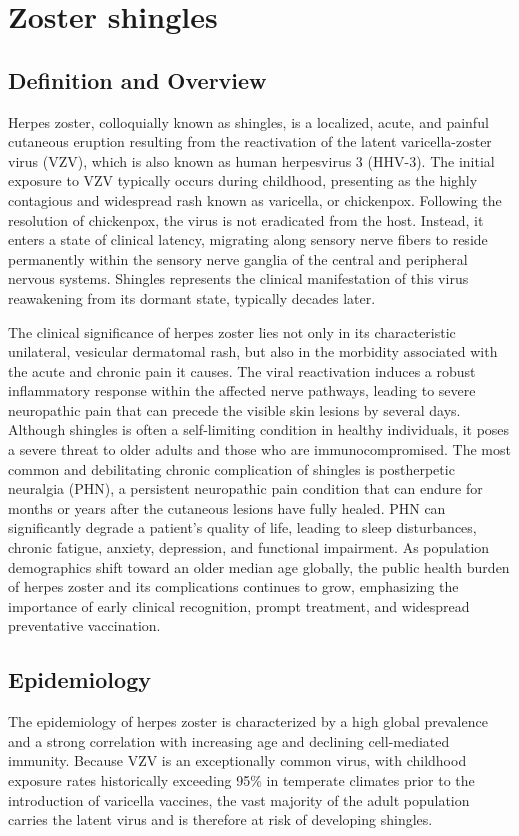 \chapter{Zoster shingles}

\section*{Definition and Overview}
Herpes zoster, colloquially known as shingles, is a localized, acute, and painful cutaneous eruption resulting from the reactivation of the latent varicella-zoster virus (VZV), which is also known as human herpesvirus 3 (HHV-3). The initial exposure to VZV typically occurs during childhood, presenting as the highly contagious and widespread rash known as varicella, or chickenpox. Following the resolution of chickenpox, the virus is not eradicated from the host. Instead, it enters a state of clinical latency, migrating along sensory nerve fibers to reside permanently within the sensory nerve ganglia of the central and peripheral nervous systems. Shingles represents the clinical manifestation of this virus reawakening from its dormant state, typically decades later.

The clinical significance of herpes zoster lies not only in its characteristic unilateral, vesicular dermatomal rash, but also in the morbidity associated with the acute and chronic pain it causes. The viral reactivation induces a robust inflammatory response within the affected nerve pathways, leading to severe neuropathic pain that can precede the visible skin lesions by several days. Although shingles is often a self-limiting condition in healthy individuals, it poses a severe threat to older adults and those who are immunocompromised. The most common and debilitating chronic complication of shingles is postherpetic neuralgia (PHN), a persistent neuropathic pain condition that can endure for months or years after the cutaneous lesions have fully healed. PHN can significantly degrade a patient's quality of life, leading to sleep disturbances, chronic fatigue, anxiety, depression, and functional impairment. As population demographics shift toward an older median age globally, the public health burden of herpes zoster and its complications continues to grow, emphasizing the importance of early clinical recognition, prompt treatment, and widespread preventative vaccination.

\section*{Epidemiology}
The epidemiology of herpes zoster is characterized by a high global prevalence and a strong correlation with increasing age and declining cell-mediated immunity. Because VZV is an exceptionally common virus, with childhood exposure rates historically exceeding 95\% in temperate climates prior to the introduction of varicella vaccines, the vast majority of the adult population carries the latent virus and is therefore at risk of developing shingles.

